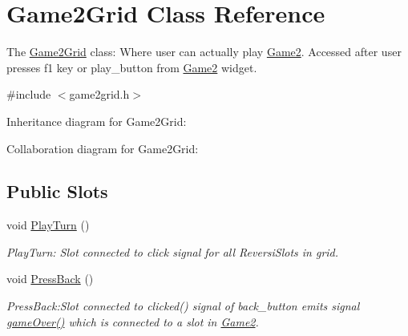 \hypertarget{classGame2Grid}{}\section{Game2\+Grid Class Reference}
\label{classGame2Grid}


The \hyperlink{classGame2Grid}{Game2\+Grid} class\+: Where user can actually play \hyperlink{classGame2}{Game2}. Accessed after user presses f1 key or play\+\_\+button from \hyperlink{classGame2}{Game2} widget.  




{\ttfamily \#include $<$game2grid.\+h$>$}



Inheritance diagram for Game2\+Grid\+:


Collaboration diagram for Game2\+Grid\+:
\subsection*{Public Slots}
\begin{DoxyCompactItemize}
\item 
void \hyperlink{classGame2Grid_a0b6b7e172797f39841d9cff2964777fa}{Play\+Turn} ()
\begin{DoxyCompactList}\small\item\em Play\+Turn\+: Slot connected to click signal for all Reversi\+Slots in grid. \end{DoxyCompactList}\item 
\mbox{\label{classGame2Grid_afa62f8ea4795c6826402c53110c6ba49}} 
void \hyperlink{classGame2Grid_afa62f8ea4795c6826402c53110c6ba49}{Press\+Back} ()
\begin{DoxyCompactList}\small\item\em Press\+Back\+:Slot connected to clicked() signal of back\+\_\+button emits signal \hyperlink{classGame2Grid_a33f724e897b96d77eebca3525ac4e095}{game\+Over()} which is connected to a slot in \hyperlink{classGame2}{Game2}. \end{DoxyCompactList}\end{DoxyCompactItemize}
